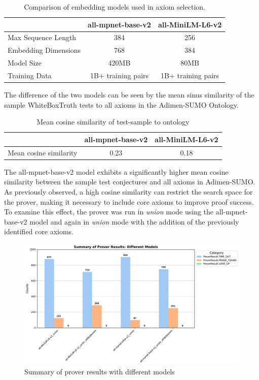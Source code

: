 \documentclass[english,version-2020-11]{uzl-thesis}
\begin{document}
\begin{table}[h]
    \centering
    \begin{tabular}{lcc}
        \hline
        & \textbf{all-mpnet-base-v2} & \textbf{all-MiniLM-L6-v2} \\
        \hline
        Max Sequence Length & 384 & 256 \\
        Embedding Dimensions & 768 & 384 \\
        Model Size & 420MB & 80MB \\
        Training Data & 1B+ training pairs & 1B+ training pairs \\
        \hline
    \end{tabular}
    \caption{Comparison of embedding models used in axiom selection.}
    \label{tab:model_comparison}
\end{table}

The difference of the two models can be seen by the mean sinus similarity of the sample WhiteBoxTruth tests to all axioms in the Adimen-SUMO Ontology.


\begin{table}[h]
    \centering
    \begin{tabular}{lcc}
        \hline
        & \textbf{all-mpnet-base-v2} & \textbf{all-MiniLM-L6-v2} \\
        \hline
        Mean cosine similarity & 0.23 & 0.18 \\
        \hline
    \end{tabular}
    \caption{Mean cosine similarity of test-sample to ontology}
    \label{tab:model_comparison_2}
\end{table}

The all-mpnet-base-v2 model exhibits a significantly higher mean cosine similarity between the sample test conjectures and all axioms in Adimen-SUMO. As previously observed, a high cosine similarity can restrict the search space for the prover, making it necessary to include core axioms to improve proof success. To examine this effect, the prover was run in \textit{union} mode using the all-mpnet-base-v2 model and again in \textit{union} mode with the addition of the previously identified core axioms.

\begin{figure}[h!]
    \centering
    \includegraphics[width=\textwidth]{different_mode_output.pdf}
    \caption{Summary of prover results with different models}
    \label{fig:results_different_models}
\end{figure}        
\FloatBarrier
\end{document}
